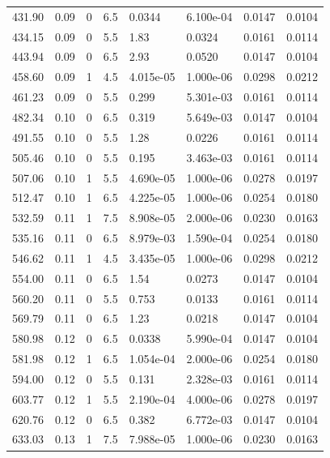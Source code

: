 \documentclass[preview]{standalone}
\begin{document}
{{{\begin{tabular}{L{1.2cm}C{1.2cm} C{0.3cm}C{0.5cm} C{1.4cm}C{1.4cm} C{1.4cm}C{1.4cm}}
  431.90  &  0.09  & 0     & 6.5 &  0.0344  & 6.100e-04  & 0.0147 &  0.0104   \\ 
  434.15  &  0.09  & 0     & 5.5 &  1.83  & 0.0324  & 0.0161 &  0.0114   \\ 
  443.94  &  0.09  & 0     & 6.5 &  2.93  & 0.0520  & 0.0147 &  0.0104   \\ 
  458.60  &  0.09  & 1     & 4.5 &  4.015e-05  & 1.000e-06  & 0.0298 &  0.0212   \\ 
  461.23  &  0.09  & 0     & 5.5 &  0.299  & 5.301e-03  & 0.0161 &  0.0114   \\ 
  482.34  &  0.10  & 0     & 6.5 &  0.319  & 5.649e-03  & 0.0147 &  0.0104   \\ 
  491.55  &  0.10  & 0     & 5.5 &  1.28  & 0.0226  & 0.0161 &  0.0114   \\ 
  505.46  &  0.10  & 0     & 5.5 &  0.195  & 3.463e-03  & 0.0161 &  0.0114   \\ 
  507.06  &  0.10  & 1     & 5.5 &  4.690e-05  & 1.000e-06  & 0.0278 &  0.0197   \\ 
  512.47  &  0.10  & 1     & 6.5 &  4.225e-05  & 1.000e-06  & 0.0254 &  0.0180   \\ 
  532.59  &  0.11  & 1     & 7.5 &  8.908e-05  & 2.000e-06  & 0.0230 &  0.0163   \\ 
  535.16  &  0.11  & 0     & 6.5 &  8.979e-03  & 1.590e-04  & 0.0254 &  0.0180   \\ 
  546.62  &  0.11  & 1     & 4.5 &  3.435e-05  & 1.000e-06  & 0.0298 &  0.0212   \\ 
  554.00  &  0.11  & 0     & 6.5 &  1.54  & 0.0273  & 0.0147 &  0.0104   \\ 
  560.20  &  0.11  & 0     & 5.5 &  0.753  & 0.0133  & 0.0161 &  0.0114   \\ 
  569.79  &  0.11  & 0     & 6.5 &  1.23  & 0.0218  & 0.0147 &  0.0104   \\ 
  580.98  &  0.12  & 0     & 6.5 &  0.0338  & 5.990e-04  & 0.0147 &  0.0104   \\ 
  581.98  &  0.12  & 1     & 6.5 &  1.054e-04  & 2.000e-06  & 0.0254 &  0.0180   \\ 
  594.00  &  0.12  & 0     & 5.5 &  0.131  & 2.328e-03  & 0.0161 &  0.0114   \\ 
  603.77  &  0.12  & 1     & 5.5 &  2.190e-04  & 4.000e-06  & 0.0278 &  0.0197   \\ 
  620.76  &  0.12  & 0     & 6.5 &  0.382  & 6.772e-03  & 0.0147 &  0.0104   \\ 
  633.03  &  0.13  & 1     & 7.5 &  7.988e-05  & 1.000e-06  & 0.0230 &  0.0163   \\ 

\end{tabular}}}}
\end{document}
